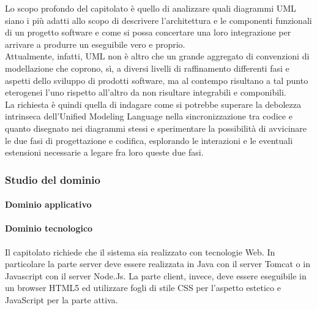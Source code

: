 		
		Lo scopo profondo del capitolato è quello di analizzare quali diagrammi UML siano i più adatti allo scopo di descrivere l'architettura 
		e le componenti funzionali di un progetto software e come si possa concertare una loro integrazione per arrivare a produrre un eseguibile vero e proprio. 
		\\Attualmente, infatti, UML non è altro che un grande aggregato di convenzioni di modellazione che coprono, sì, a diversi livelli di raffinamento differenti 
		fasi e aspetti dello sviluppo di prodotti software, ma al contempo risultano a tal punto eterogenei l'uno rispetto all'altro da non risultare integrabili e componibili. 
		\\La richiesta è quindi quella di indagare come si potrebbe superare la debolezza intrinseca dell'Unified Modeling Language nella sincronizzazione tra 
		codice e quanto disegnato nei diagrammi stessi e sperimentare la possibilità di avvicinare le due fasi di progettazione e codifica, esplorando le 
		interazioni e le eventuali estensioni necessarie a legare fra loro queste due fasi.
		\subsubsection{Studio del dominio}
			\paragraph{Dominio applicativo}
			
			\paragraph{Dominio tecnologico}
			Il capitolato richiede che il sistema sia realizzato con tecnologie Web. In particolare la parte server deve essere realizzata in Java con il server 
			Tomcat o in Javascript con il server Node.Js. La parte client, invece, deve essere eseguibile in un browser HTML5 ed utilizzare fogli di stile CSS per 
			l'aspetto estetico e JavaScript per la parte attiva.
		
